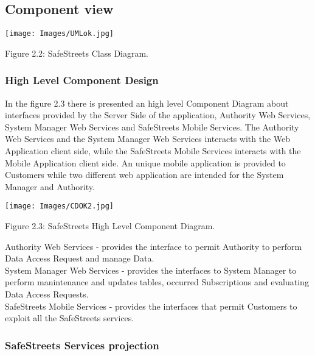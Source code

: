 \documentclass[12pt]{article}
\begin{document}
\subsection{Component view}
\vspace{5mm}
\begin{center}
\texttt{[image: Images/UMLok.jpg]}
\vspace{2mm}

Figure 2.2: SafeStreets Class Diagram.
\end{center}

\newpage
\subsubsection{High Level Component Design}
\vspace{5mm}
In the figure 2.3 there is presented an high level Component Diagram about interfaces provided by the Server Side of the application, Authority Web Services, System Manager Web Services and SafeStreets Mobile Services. The Authority Web Services and the System Manager Web Services interacts with the Web Application client side, while the SafeStreets Mobile Services interacts with the Mobile Application client side. An unique mobile application is provided to Customers while two different web application are intended for the System Manager and Authority.
\begin{center}
\texttt{[image: Images/CDOK2.jpg]}

\vspace{2mm}
Figure 2.3: SafeStreets High Level Component Diagram.
\end{center}

\newpage
\begin{flushleft}
Authority Web Services - provides the interface to permit Authority to perform Data Access Request and manage Data.
\vspace{2mm}\\
System Manager Web Services - provides the interfaces to System Manager to perform manintenance and updates tables, occurred Subscriptions and evaluating Data Access Requests.
\vspace{2mm}\\
SafeStreets Mobile Services - provides the interfaces that permit Customers to exploit all the SafeStreets services.
\end{flushleft}

\subsubsection{SafeStreets Services projection }
\end{document}
